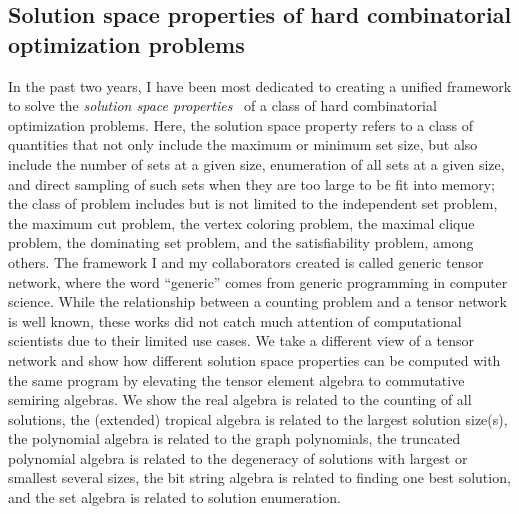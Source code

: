 \documentclass[a4paper]{article}
\newcommand{\<}{\langle}
\renewcommand{\>}{\rangle}
\begin{document}
\subsection{Solution space properties of hard combinatorial optimization problems}
In the past two years, I have been most dedicated to creating a unified framework to solve the \textit{solution space properties}~\cite{Liu2022} of a class of hard combinatorial optimization problems. Here, the solution space property refers to a class of quantities that not only include the maximum or minimum set size, but also include the number of sets at a given size, enumeration of all sets at a given size, and direct sampling of such sets when they are too large to be fit into memory; the class of problem includes but is not limited to the independent set problem, the maximum cut problem, the vertex coloring problem, the maximal clique problem, the dominating set problem, and the satisfiability problem, among others. The framework I and my collaborators created is called generic tensor network, where the word ``generic'' comes from generic programming in computer science.
While the relationship between a counting problem and a tensor network is well known, these works did not catch much attention of computational scientists due to their limited use cases.
We take a different view of a tensor network and show how different solution space properties can be computed with the same program by elevating the tensor element algebra to commutative semiring algebras.
We show the real algebra is related to the counting of all solutions, the (extended) tropical algebra is related to the largest solution size(s), the polynomial algebra is related to the graph polynomials, the truncated polynomial algebra is related to the degeneracy of solutions with largest or smallest several sizes, the bit string algebra is related to finding one best solution, and the set algebra is related to solution enumeration.
\end{document}
